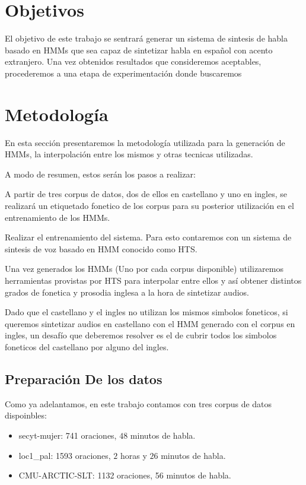 \section{Objetivos}

El objetivo de este trabajo se sentrará generar un sistema de sintesis de habla basado en HMMs que sea capaz de sintetizar habla en español con acento extranjero. Una vez obtenidos resultados que consideremos aceptables, procederemos a una etapa de experimentación donde buscaremos \completarObjetivos

\break

\section{Metodología}

En esta sección presentaremos la metodología utilizada para la generación de HMMs, la interpolación entre los mismos y otras tecnicas utilizadas.


A modo de resumen, estos serán los pasos a realizar:


A partir de tres corpus de datos, dos de ellos en castellano y uno en ingles, se realizará un etiquetado fonetico de los corpus para su posterior utilización en el entrenamiento de los HMMs.


Realizar el entrenamiento del sistema. Para esto contaremos con un sistema de sintesis de voz basado en HMM conocido como HTS. 


Una vez generados los HMMs (Uno por cada corpus disponible) utilizaremos herramientas provistas por HTS para interpolar entre ellos y así obtener distintos grados de fonetica y prosodia inglesa a la hora de sintetizar audios.


Dado que el castellano y el ingles no utilizan los mismos simbolos foneticos, si queremos sintetizar audios en castellano con el HMM generado con el corpus en ingles, un desafío que deberemos resolver es el de cubrir todos los simbolos foneticos del castellano por alguno del ingles.

\subsection{Preparación De los datos}


Como ya adelantamos, en este trabajo contamos con tres corpus de datos dispoinbles:


\begin{itemize}
\item secyt-mujer: 741 oraciones, $48$ minutos de habla.
\item loc1\_pal: 1593 oraciones, $2$ horas y $26$ minutos de habla.
\item CMU-ARCTIC-SLT: 1132 oraciones, 56 minutos de habla.
\end{itemize}


